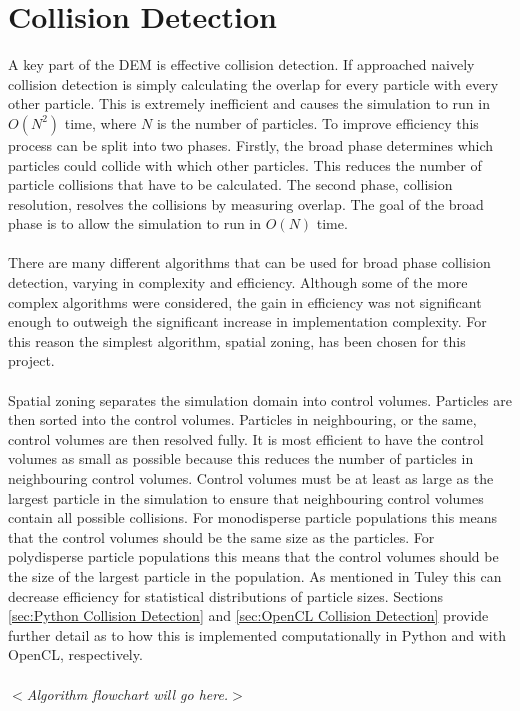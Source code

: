 \documentclass[10pt,a4paper,titlepage]{report}
\begin{document}
\section{Collision Detection}
\label{sec:collision detection}
A key part of the DEM is effective collision detection. If approached naively collision detection is simply calculating the overlap for every particle with every other particle. This is extremely inefficient and causes the simulation to run in $O(N^2)$ time, where $N$ is the number of particles. To improve efficiency this process can be split into two phases. Firstly, the broad phase determines which particles could collide with which other particles. This reduces the number of particle collisions that have to be calculated. The second phase, collision resolution, resolves the collisions by measuring overlap. The goal of the broad phase is to allow the simulation to run in $O(N)$ time.
\\\\There are many different algorithms that can be used for broad phase collision detection, varying in complexity and efficiency. Although some of the more complex algorithms were considered, the gain in efficiency was not significant enough to outweigh the significant increase in implementation complexity. For this reason the simplest algorithm, spatial zoning, has been chosen for this project.
\\\\Spatial zoning separates the simulation domain into control volumes. Particles are then sorted into the control volumes. Particles in neighbouring, or the same, control volumes are then resolved fully. It is most efficient to have the control volumes as small as possible because this reduces the number of particles in neighbouring control volumes. Control volumes must be at least as large as the largest particle in the simulation to ensure that neighbouring control volumes contain all possible collisions. For monodisperse particle populations this means that the control volumes should be the same size as the particles. For polydisperse particle populations this means that the control volumes should be the size of the largest particle in the population. As mentioned in Tuley\cite{tuley} this can decrease efficiency for statistical distributions of particle sizes. Sections \ref{sec:Python Collision Detection} and \ref{sec:OpenCL Collision Detection} provide further detail as to how this is implemented computationally in Python and with OpenCL, respectively.
\\\\$<$\textit{Algorithm flowchart will go here.}$>$
\end{document}
